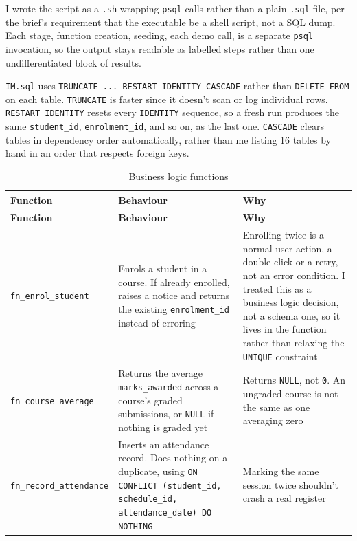 \documentclass[12pt,a4paper]{article}
\begin{document}
I wrote the script as a \lstinline|.sh| wrapping \lstinline|psql| calls rather than a plain \lstinline|.sql| file, per the brief's requirement that the executable be a shell script, not a SQL dump. Each stage, function creation, seeding, each demo call, is a separate \lstinline|psql| invocation, so the output stays readable as labelled steps rather than one undifferentiated block of results.

\lstinline|IM.sql| uses \lstinline|TRUNCATE ... RESTART IDENTITY CASCADE| rather than \lstinline|DELETE FROM| on each table. \lstinline|TRUNCATE| is faster since it doesn't scan or log individual rows. \lstinline|RESTART IDENTITY| resets every \lstinline|IDENTITY| sequence, so a fresh run produces the same \lstinline|student_id|, \lstinline|enrolment_id|, and so on, as the last one. \lstinline|CASCADE| clears tables in dependency order automatically, rather than me listing 16 tables by hand in an order that respects foreign keys.

\footnotesize
\renewcommand{\arraystretch}{1.3}
\begin{longtable}{@{} >{\raggedright\arraybackslash}p{3.4cm} >{\raggedright\arraybackslash}p{5.8cm} >{\raggedright\arraybackslash}p{5.8cm} @{}}
\caption{Business logic functions}\\
\toprule
\textbf{Function} & \textbf{Behaviour} & \textbf{Why} \\
\midrule
\endfirsthead

\toprule
\textbf{Function} & \textbf{Behaviour} & \textbf{Why} \\
\midrule
\endhead

\bottomrule
\endfoot

\lstinline|fn_enrol_student| & Enrols a student in a course. If already enrolled, raises a notice and returns the existing \lstinline|enrolment_id| instead of erroring & Enrolling twice is a normal user action, a double click or a retry, not an error condition. I treated this as a business logic decision, not a schema one, so it lives in the function rather than relaxing the \lstinline|UNIQUE| constraint \\[0.6em]

\lstinline|fn_course_average| & Returns the average \lstinline|marks_awarded| across a course's graded submissions, or \lstinline|NULL| if nothing is graded yet & Returns \lstinline|NULL|, not \lstinline|0|. An ungraded course is not the same as one averaging zero \\[0.6em]

\lstinline|fn_record_attendance| & Inserts an attendance record. Does nothing on a duplicate, using \lstinline|ON CONFLICT (student_id, schedule_id, attendance_date) DO NOTHING| & Marking the same session twice shouldn't crash a real register \\

\end{longtable}
\renewcommand{\arraystretch}{1.0}
\normalsize
\end{document}
